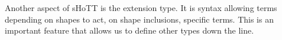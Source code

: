 \documentclass[main.tex]{subfiles}
\begin{document}
Another aspect of sHoTT is the extension type. It is syntax allowing terms depending on shapes to act, on shape inclusions, specific terms.
This is an important feature that allows us to define other types down the line.
\end{document}
